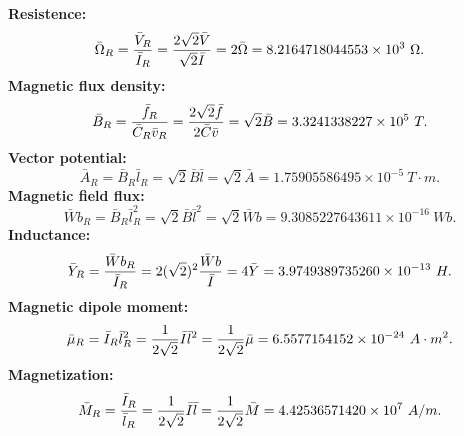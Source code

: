 \documentclass[12pt,a4paper]{article}
\def\barohmry{8.2164718044553\times 10^{3}}
\def\barbry{3.3241338227\times 10^{5}}
\def\baravry{1.75905586495\times 10^{-5}}
\def\barwbry{9.3085227643611\times 10^{-16}}
\def\baryry{3.9749389735260\times 10^{-13}}
\def\barmury{6.5577154152\times 10^{-24}}
\def\barmagry{4.42536571420\times 10^{7}}
\begin{document}
{{\bf Resistence:}
\begin{equation}
\bar \Omega_R={\bar V_R \over \bar I_R}= {2 \sqrt{2} \bar V \over \sqrt{2} 
\bar I}
= 2 \bar \Omega=\barohmry\ \Omega.
\end{equation}
{\bf Magnetic flux density:}
\begin{equation}
\bar B_R={\bar f_R \over \bar C_R \bar v_R}= {2 \sqrt{2} \bar f \over 2 
\bar C \bar v}
= \sqrt{2} \bar B=\barbry\ T.
\end{equation}
{\bf Vector potential:}
\begin{equation}
\bar A_R={\bar B_R \bar l_R }= \sqrt{2} \bar B \bar l 
= \sqrt{2} \bar A=\baravry\ T\cdot m.
\end{equation}
{\bf Magnetic field flux:}
\begin{equation}
\bar Wb_R={\bar B_R \bar l_R^2 }= \sqrt{2} \bar B \bar l^2
= \sqrt{2} \bar Wb=\barwbry\ Wb.
\end{equation}
{\bf Inductance:}
\begin{equation}
\bar Y_R={\bar Wb_R \over \bar I_R }= 2 (\sqrt{2})^2 {\bar Wb \over \bar I}
= 4 \bar Y=\baryry\ H.
\end{equation}
{\bf Magnetic dipole moment:}
\begin{equation}
\bar \mu_R={\bar I_R \bar l_R^2}= {1\over 2\sqrt{2}} {\bar I \bar l^2}
= {1\over 2\sqrt{2}} \bar \mu=\barmury\ A\cdot m^2.
\end{equation}
{\bf Magnetization:}
\begin{equation}
\bar M_R={\bar I_R \over \bar l_R}= {1\over 2\sqrt{2}} {\bar I \bar l}
= {1\over 2\sqrt{2}} \bar M=\barmagry\ A/m.
\end{equation}

}
\end{document}
